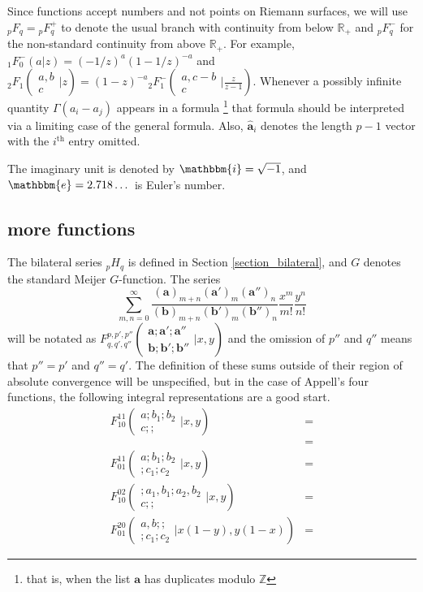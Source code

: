 \documentclass[12pt]{article}
\newcommand{\ee}[0] {\mathbbm{e}}
\newcommand{\ii}[0] {\mathbbm{i}}
\numberwithin{equation}{section}
\newcommand{\Head}[3] {{}_{#1}{#2}_{#3}}
\newcommand{\ArgS}[3] {( \begin{smallmatrix} #1 \\ #2 \end{smallmatrix} | {#3})}
\newcommand{\TwoHead}[3] {{#1}_{#3}^{#2}}
\newcommand{\FFs}[6] {{}_{#1}{#2}_{#3} ( \begin{smallmatrix} #4 \\ #5 \end{smallmatrix} | {#6}  )}
\newcommand{\FFes}[7] {{}_{#1}^{\,}{#2}_{#3}^{#4} ( \begin{smallmatrix} #5 \\ #6 \end{smallmatrix} | {#7} )}
\newcommand{\bfa}[0] {\mathbf{a}}
\newcommand{\bfb}[0] {\mathbf{b}}
\begin{document}
Since functions accept numbers and not points on Riemann surfaces, we will use ${}_p F_{q} = {}_p F_{q}^{+}$ to denote the usual branch with continuity from below $\mathbb{R}_{+}$ and ${}_p^{\,} F_{q}^{-}$ for the non-standard continuity from above $\mathbb{R}_{+}$. For example, $\Head{1}{F}{0}^{-}(a|z) = (-1/z)^a (1-1/z)^{-a}$ and $\FFs{2}{F}{1}{a,b}{c}{z} = (1-z)^{-a} \FFes{2}{F}{1}{-}{a,c-b}{c}{\tfrac{z}{z-1}}$. Whenever a possibly infinite quantity $\Gamma(a_i-a_j)$ appears in a formula \footnote{that is, when the list $\bfa$ has duplicates modulo $\mathbb{Z}$} that formula should be interpreted via a limiting case of the general formula. Also, $\hat{\mathbf{a}}_i$ denotes the length $p-1$ vector with the $i^{\text{th}}$ entry omitted.

The imaginary unit is denoted by $\ii = \sqrt{-1}$, and $\ee = 2.718\dots$ is Euler's number.

\subsection{more functions}
The bilateral series $\Head{p}{H}{q}$ is defined in Section \ref{section_bilateral}, and $G$ denotes the standard Meijer $G$-function. The series
\begin{equation*}
\sum_{m,n=0}^{\infty} \frac{(\bfa)_{m+n}(\bfa')_{m}(\bfa'')_{n}}{(\bfb)_{m+n}(\bfb')_{m}(\bfb'')_{n}} \frac{x^m}{m!} \frac{y^n}{n!}
\end{equation*}
will be notated as $\TwoHead{F}{p,p',p''}{q,q',q''} \ArgS{\bfa;\bfa';\bfa''}{\bfb;\bfb';\bfb''}{x,y}$ and the omission of $p''$ and $q''$ means that $p''=p'$ and $q''=q'$. The definition of these sums outside of their region of absolute convergence will be unspecified, but in the case of Appell's four functions, the following integral representations are a good start.
\begin{align*}
\TwoHead{F}{11}{10} \ArgS{a;b_1;b_2}{c;;}{x,y} &=\\
&=\\
\TwoHead{F}{11}{01} \ArgS{a;b_1;b_2}{;c_1;c_2}{x,y} &=\\
\TwoHead{F}{02}{10} \ArgS{;a_1,b_1;a_2,b_2}{c;;}{x,y} &=\\
\TwoHead{F}{20}{01} \ArgS{a,b;;}{;c_1;c_2}{x(1-y),y(1-x)} &=
\end{align*}
\end{document}
